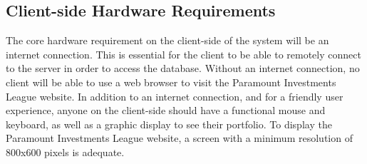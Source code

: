 \subsection{Client-side Hardware Requirements}

The core hardware requirement on the client-side of the system
will be an internet connection. This is essential for the client
to be able to remotely connect to the server in order to access
the database. Without an internet connection, no client will be
able to use a web browser to visit the Paramount Investments League
website. In addition to an internet connection, and for a friendly
user experience, anyone on the client-side should have a functional
mouse and keyboard, as well as a graphic display to see their
portfolio. To display the Paramount Investments League website,
a screen with a minimum resolution of 800x600 pixels is adequate.


